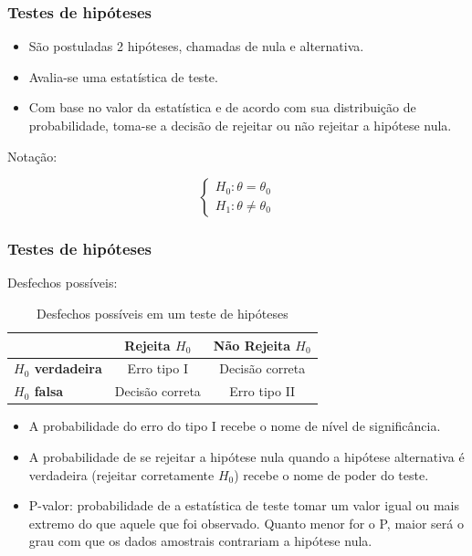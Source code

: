 \documentclass[10pt,
  aspectratio=169,
  serif,
  mathserif,
  professionalfont,
  compress,
  handout,
  ]{beamer}\usepackage[]{graphicx}\usepackage[]{color}
\begin{document}
\begin{frame}
  \frametitle{Testes de hipóteses}
  \begin{itemize}
    \itemsep 2ex
  
  \item São postuladas 2 hipóteses, chamadas de nula e alternativa.
  
  \item Avalia-se uma estatística de teste. 
  
  \item Com base no valor da estatística e de acordo com sua distribuição de probabilidade, toma-se a decisão de rejeitar ou não rejeitar a hipótese nula.
    
  \end{itemize}
    
Notação:

$$
\left\{\begin{matrix}
H_0: \theta = \theta_0 \\ 
H_1: \theta \neq \theta_0
\end{matrix}\right.
$$

\end{frame}


\begin{frame}
  \frametitle{Testes de hipóteses}
  
  Desfechos possíveis:
  
  \begin{table}[]
\begin{tabular}{l|cc}
\hline
\multicolumn{1}{c|}{}    & \textbf{Rejeita $H_0$} & \textbf{Não Rejeita $H_0$} \\ \hline
\textbf{$H_0$ verdadeira} & Erro tipo I           & Decisão correta           \\
\textbf{$H_0$ falsa}      & Decisão correta       & Erro tipo II              \\ \hline
\end{tabular}
\caption{Desfechos possíveis em um teste de hipóteses}
\label{tab:my-table}
\end{table}
  
  \begin{itemize}
    \itemsep 2ex
  
  \item A probabilidade do erro do tipo I recebe o nome de nível de significância.
  
  \item A probabilidade de se rejeitar a hipótese nula quando a hipótese alternativa é verdadeira (rejeitar corretamente $H_0$) recebe o nome de poder do teste.
  
  \item P-valor: probabilidade de a estatística de teste tomar um valor igual ou mais extremo do que aquele que foi observado. Quanto menor for o P, maior será o grau com que os dados amostrais contrariam a hipótese nula.
    
  \end{itemize}

\end{frame}
\end{document}
